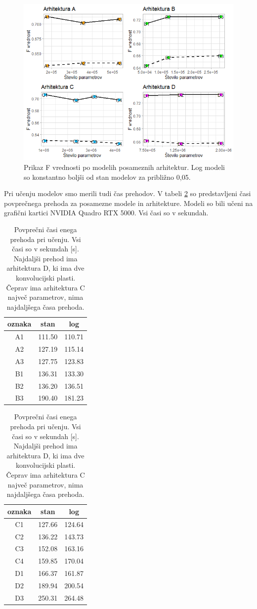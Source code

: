 \documentclass[a4paper, 12pt, openright]{book}
\begin{document}
\begin{figure}
    \centering
    \includegraphics[width=\textwidth]{fscore.png}
    \caption{Prikaz F vrednosti po modelih posameznih arhitektur. Log modeli so konstantno boljši od stan modelov za približno 0,05.}
    \label{fig:fscore}
\end{figure}

Pri učenju modelov smo merili tudi čas prehodov. V tabeli \ref{tab:times} so predstavljeni časi povprečnega prehoda za posamezne modele in arhitekture.
Modeli so bili učeni na grafični kartici NVIDIA Quadro RTX 5000.
Vsi časi so v sekundah.

\begin{table}[]
    \centering
    \begin{tabular}{c|c|c}
        oznaka & stan & log \\
		\hline
        A1 & 111.50 & 110.71 \\
		A2 & 127.19 & 115.14 \\
		A3 & 127.75 & 123.83 \\
		\hline
		B1 & 136.31 & 133.30 \\
		B2 & 136.20 & 136.51 \\
		B3 & 190.40 & 181.23 \\
    \end{tabular}
    \hspace{1em}
    \begin{tabular}{c|c|c}
        oznaka & stan & log \\
		\hline
		C1 & 127.66 & 124.64 \\
		C2 & 136.22 & 143.73 \\
		C3 & 152.08 & 163.16 \\
		C4 & 159.85 & 170.04 \\
		\hline
		D1 & 166.37 & 161.87 \\
		D2 & 189.94 & 200.54 \\
		D3 & 250.31 & 264.48 \\
    \end{tabular}
    \caption{Povprečni časi enega prehoda pri učenju. Vsi časi so v sekundah [s]. Najdaljši prehod ima arhitektura D, ki ima dve konvolucijski plasti. Čeprav ima arhitektura C največ parametrov, nima najdaljšega časa prehoda.}
    \label{tab:times}
\end{table}
\end{document}
